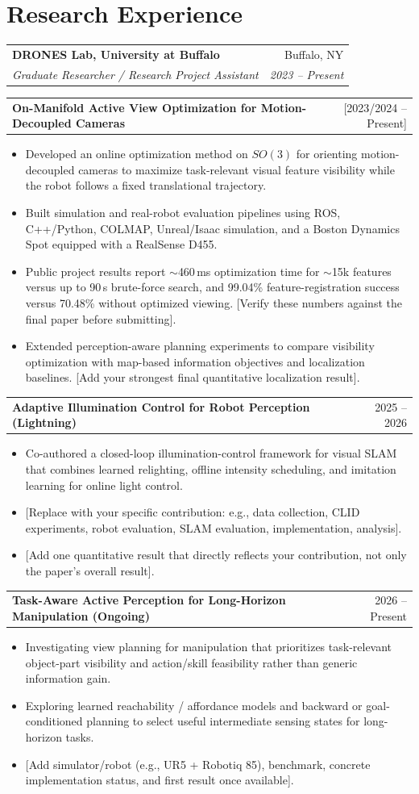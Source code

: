 \documentclass[10.5pt,letterpaper]{article}
\makeatletter
\newcommand{\todo}[1]{\textcolor{placeholder}{[#1]}}
\newcommand{\resumeSubheading}[4]{
  \begin{tabularx}{\textwidth}{@{}Xr@{}}
    \textbf{#1} & #2 \\
    \textit{#3} & \textit{#4}
  \end{tabularx}
  \vspace{-2pt}
}
\newcommand{\resumeProjectHeading}[2]{
  \begin{tabularx}{\textwidth}{@{}Xr@{}}
    \textbf{#1} & #2
  \end{tabularx}
  \vspace{-3pt}
}
\newcommand{\resumeItem}[1]{\item \small #1}
\makeatother
\begin{document}
\section{Research Experience}

\resumeSubheading
{DRONES Lab, University at Buffalo}{Buffalo, NY}
{Graduate Researcher / Research Project Assistant}{2023 -- Present}

\resumeProjectHeading
{On-Manifold Active View Optimization for Motion-Decoupled Cameras}
{\todo{2023/2024 -- Present}}
\begin{itemize}
    \resumeItem{Developed an online optimization method on $SO(3)$ for orienting motion-decoupled cameras to maximize task-relevant visual feature visibility while the robot follows a fixed translational trajectory.}
    \resumeItem{Built simulation and real-robot evaluation pipelines using ROS, C++/Python, COLMAP, Unreal/Isaac simulation, and a Boston Dynamics Spot equipped with a RealSense D455.}
    \resumeItem{Public project results report $\sim$460\,ms optimization time for $\sim$15k features versus up to 90\,s brute-force search, and 99.04\% feature-registration success versus 70.48\% without optimized viewing. \todo{Verify these numbers against the final paper before submitting}.}
    \resumeItem{Extended perception-aware planning experiments to compare visibility optimization with map-based information objectives and localization baselines. \todo{Add your strongest final quantitative localization result}.}
\end{itemize}

\resumeProjectHeading
{Adaptive Illumination Control for Robot Perception (Lightning)}
{2025 -- 2026}
\begin{itemize}
    \resumeItem{Co-authored a closed-loop illumination-control framework for visual SLAM that combines learned relighting, offline intensity scheduling, and imitation learning for online light control.}
    \resumeItem{\todo{Replace with your specific contribution: e.g., data collection, CLID experiments, robot evaluation, SLAM evaluation, implementation, analysis}.}
    \resumeItem{\todo{Add one quantitative result that directly reflects your contribution, not only the paper's overall result}.}
\end{itemize}

\resumeProjectHeading
{Task-Aware Active Perception for Long-Horizon Manipulation (Ongoing)}
{2026 -- Present}
\begin{itemize}
    \resumeItem{Investigating view planning for manipulation that prioritizes task-relevant object-part visibility and action/skill feasibility rather than generic information gain.}
    \resumeItem{Exploring learned reachability / affordance models and backward or goal-conditioned planning to select useful intermediate sensing states for long-horizon tasks.}
    \resumeItem{\todo{Add simulator/robot (e.g., UR5 + Robotiq 85), benchmark, concrete implementation status, and first result once available}.}
\end{itemize}
\end{document}
